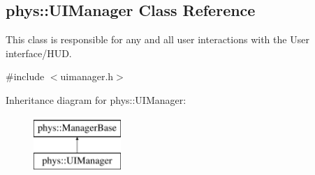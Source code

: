 \hypertarget{classphys_1_1UIManager}{
\subsection{phys::UIManager Class Reference}
\label{d5/dc5/classphys_1_1UIManager}
}


This class is responsible for any and all user interactions with the User interface/HUD.  




{\ttfamily \#include $<$uimanager.h$>$}

Inheritance diagram for phys::UIManager:\begin{figure}[H]
\begin{center}
\leavevmode
\includegraphics[height=2.000000cm]{d5/dc5/classphys_1_1UIManager}
\end{center}
\end{figure}

